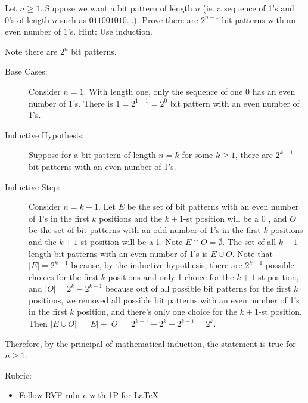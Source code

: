 \documentclass{article}
\theoremstyle{definition}
\begin{document}
\begin{question}
    Let $n\geq 1$. Suppose we want a bit pattern of length $n$ (ie. a sequence of 1's and 0's of length $n$ such as $011001010...$). Prove there are $2^{n-1}$ bit patterns with an even number of 1's. Hint: Use induction.
\end{question}
\begin{solution}
        Note there are $2^n$ bit patterns. 
	\begin{description}
	\item[Base Cases: ] Consider $n=1$. With length one, only the sequence of one 0 has an even number of 1's. There is $1=2^{1-1} = 2^0$ bit pattern with an even number of 1's.
	
	\item[Inductive Hypothesis: ] Suppose for a bit pattern of length $n=k$ for some $k\geq 1$, there are $2^{k-1}$ bit patterns with an even number of 1's.
	
	\item[Inductive Step: ] Consider $n=k+1$. Let $E$ be the set of bit patterns with an even number of 1's in the first $k$ positions and the $k+1$-st position will be a 0 , and $O$ be the set of bit patterns with an odd number of 1's in the first $k$ positions and the $k+1$-st position will be a 1. Note $E\cap O=\emptyset$. The set of all $k+1$-length bit patterns with an even number of 1's is $E\cup O$. Note that $|E| = 2^{k-1}$ because, by the inductive hypothesis, there are $2^{k-1}$ possible choices for the first $k$ positions and only 1 choice for the $k+1$-st position, and $|O|=2^{k} -2^{k-1}$ because out of all possible bit patterns for the first $k$ positions, we removed all possible bit patterns with an even number of 1's in the first $k$ position, and there's only one choice for the $k+1$-st position. Then $|E\cup O| = |E| + |O| = 2^{k-1}+2^k-2^{k-1} = 2^k$. 
	\end{description}
	Therefore, by the principal of mathematical induction, the statement is true for $n\geq 1$.
	
{\color{red} Rubric:
\begin{itemize}
\item Follow RVF rubric with 1P for \LaTeX
\end{itemize}}
\end{solution}
\end{document}
